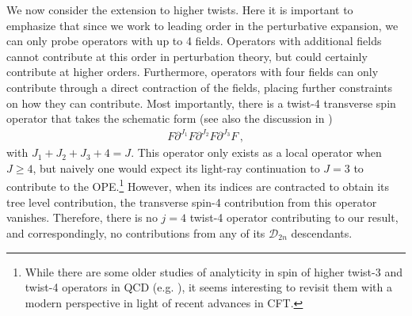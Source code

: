\documentclass[letterpaper,11pt]{article}
\def\cD{\mathcal{D}}
\begin{document}
We now consider the extension to higher twists. Here it is important to emphasize that since we work to leading order in the perturbative expansion, we can only probe operators with up to 4 fields. Operators with additional fields cannot contribute at this order in perturbation theory, but could certainly contribute at higher orders. Furthermore, operators with four fields can only contribute through a direct contraction of the fields, placing further constraints on how they can contribute. Most importantly, there is a twist-4 transverse spin operator that takes the schematic form (see also the discussion in \cite{1822249})
\begin{align}\label{eq:twist4_op}
F \partial^{J_1}F \partial^{J_2}F\partial^{J_3}F\,,
\end{align}
with $J_1+J_2+J_3+4=J$. This operator only exists as a local operator when $J\geq 4$, but naively one would expect its light-ray continuation to $J=3$ to contribute to the OPE.\footnote{While there are some older studies of analyticity in spin of higher twist-3 and twist-4 operators in QCD (e.g. \cite{Ali:1991em,Belitsky:1997zw,Belitsky:1997by,Braun:2009vc,Ji:2014eta}), it seems interesting to revisit them with a modern perspective in light of recent advances in CFT. } However, when its indices are contracted to obtain its tree level contribution, the transverse spin-4 contribution from this operator vanishes. Therefore, there is no $j=4$ twist-4 operator contributing to our result, and correspondingly, no contributions from any of its $\cD_{2n}$ descendants. 
\end{document}

